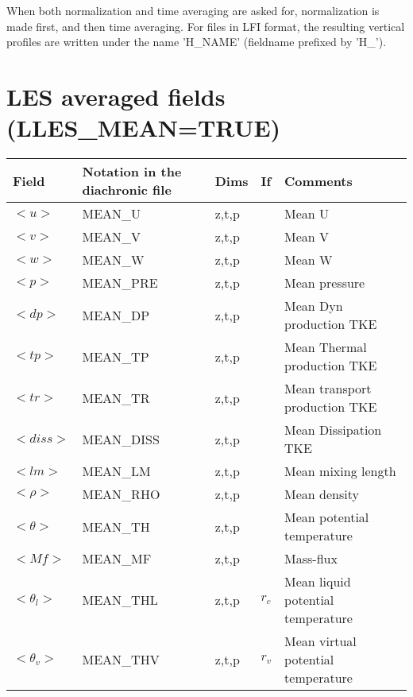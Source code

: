 When both normalization and time averaging are asked for,
normalization is made first, and then time averaging. For files in LFI format, the resulting
vertical profiles are written under the name 'H\_NAME' (fieldname prefixed by 'H\_').



\section{LES averaged fields (LLES\_MEAN=TRUE)}

\begingroup
\renewcommand\arraystretch{1.5}
\begin{longtable}[c]{|p{}|p{}|p{}|p{}|p{}|}
\hline
Field & Notation in the diachronic file & Dims & If  & Comments \\
\hline \hline
\endhead
$<u>$               & MEAN\_U      & z,t,p   &       & Mean U \\\hline
$<v>$               & MEAN\_V      & z,t,p   &       & Mean V \\\hline
$<w>$               & MEAN\_W      & z,t,p   &       & Mean W \\\hline
$<p>$               & MEAN\_PRE    & z,t,p   &       & Mean pressure \\\hline
$<dp>$              & MEAN\_DP     & z,t,p   &       & Mean Dyn production TKE \\\hline
$<tp>$              & MEAN\_TP     & z,t,p   &       & Mean Thermal production TKE \\\hline
$<tr>$              & MEAN\_TR     & z,t,p   &       & Mean transport production TKE \\\hline
$<diss>$            & MEAN\_DISS   & z,t,p   &       & Mean Dissipation TKE \\\hline
$<lm>$              & MEAN\_LM     & z,t,p   &       & Mean mixing length \\\hline
$<\rho>$            & MEAN\_RHO    & z,t,p   &       & Mean density \\\hline
$<\theta>$          & MEAN\_TH     & z,t,p   &       & Mean potential temperature\\\hline
$<Mf>$              & MEAN\_MF     & z,t,p   &       & Mass-flux \\\hline
$<\theta_l>$        & MEAN\_THL    & z,t,p   & $r_c$ & Mean liquid potential temperature \\\hline
$<\theta_v>$        & MEAN\_THV    & z,t,p   & $r_v$ & Mean virtual potential temperature \\\hline

\end{longtable}
